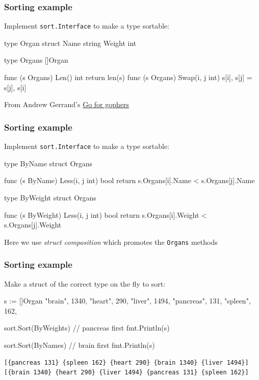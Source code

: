 \documentclass[handout,compress,t,11pt]{beamer}
\begin{document}
\begin{frame}[fragile]
    \frametitle{Sorting example}
    Implement  \verb|sort.Interface| to make a type sortable: \par
    \vspace{\baselineskip}
\begin{golang}
type Organ struct {
    Name   string
    Weight int
}

type Organs []Organ

func (s Organs) Len() int      { return len(s) }
func (s Organs) Swap(i, j int) { s[i], s[j] = s[j], s[i] }
\end{golang}
\vspace{3\baselineskip}
From Andrew Gerrand's \href{https://talks.golang.org/2014/go4gophers.slide#1}{Go for gophers}
\end{frame}

\begin{frame}[fragile]
    \frametitle{Sorting example}
    Implement  \verb|sort.Interface| to make a type sortable: \par
    \vspace{0.6\baselineskip}
\begin{golang}
type ByName struct{ Organs }

func (s ByName) Less(i, j int) bool { 
    return s.Organs[i].Name < s.Organs[j].Name 
}

type ByWeight struct{ Organs }

func (s ByWeight) Less(i, j int) bool { 
    return s.Organs[i].Weight < s.Organs[j].Weight
}
\end{golang}
    \vspace{0.6\baselineskip}
    Here we use {\em struct composition} which promotes the \verb|Organs| methods
\end{frame}

\begin{frame}[fragile]
    \frametitle{Sorting example}
    Make a struct of the correct type on the fly to sort: \par
\begin{golang}
    s := []Organ{
        {"brain", 1340},
        {"heart", 290},
        {"liver", 1494},
        {"pancreas", 131},
        {"spleen", 162},
    }

    sort.Sort(ByWeight{s})      // pancreas first
    fmt.Println(s)

    sort.Sort(ByName{s})        // brain first
    fmt.Println(s)
\end{golang}
{\scriptsize
\begin{verbatim}
[{pancreas 131} {spleen 162} {heart 290} {brain 1340} {liver 1494}]
[{brain 1340} {heart 290} {liver 1494} {pancreas 131} {spleen 162}]
\end{verbatim}}
\end{frame}
\end{document}
